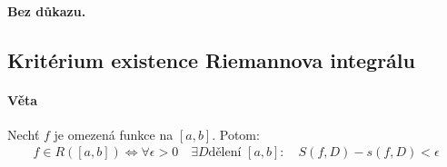 \documentclass[a4paper,10pt]{article}
\begin{document}
\paragraph{Bez důkazu.}


\subsection{Kritérium existence Riemannova integrálu}
\setcounter{equation}{0}
\paragraph{Věta}
Nechť $f$ je omezená funkce na $[a,b]$. Potom:
\begin{align*}
	f \in R([a,b]) \Leftrightarrow \forall \epsilon > 0 \quad  \exists D \text{
	dělení } [a,b]: \quad S(f, D) - s(f,D) < \epsilon
\end{align*}
\end{document}
